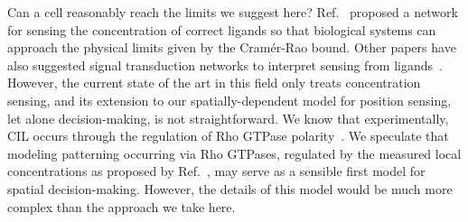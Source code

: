 Can a cell reasonably reach the limits we suggest here?
Ref.~\cite{mora2015physical} proposed a network for sensing the concentration of correct ligands so that biological systems can approach the physical limits given by the Cram\'{e}r-Rao bound.
Other papers have also suggested signal transduction networks to interpret sensing from ligands~\cite{singh2017simple, ten2012fundamental}.
However, the current state of the art in this field only treats concentration sensing, and its extension to our spatially-dependent model for position sensing, let alone decision-making, is not straightforward.
We know that experimentally, CIL occurs through the regulation of Rho GTPase polarity~\cite{lin2015interplay}.
We speculate that modeling patterning occurring via Rho GTPases, regulated by the measured local concentrations as proposed by Ref.~\cite{mora2015physical}, may serve as a sensible first model for spatial decision-making.
However, the details of this model would be much more complex than the approach we take here.

